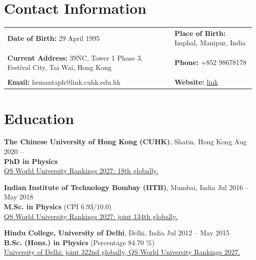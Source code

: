 \documentclass[margin,line]{res}
\begin{document}
 \hfill {}

\begin{resume}

\section{\sc Contact Information}

\vspace{.05in}
\begin{tabular}{@{}p{3.5in}p{2.2in}}
{\bf Date of Birth:} 29 April 1995 & {\bf Place of Birth:} Imphal, Manipur, India \\ \\
{\bf Current Address:} 39NC, Tower 1 Phase 3, Festival City, Tai Wai, Hong Kong & {\bf Phone:} +852 98678178 \\ \\
{\bf Email:} hemantaph@link.cuhk.edu.hk & { \bf Website:} \href{http://hemantaph.com/}{link}
\end{tabular}


\vspace{.25in}
\section{\sc Education}
{\bf The Chinese University of Hong Kong (CUHK)}, Shatin, Hong Kong \hfill Aug 2020 -- \\
{\bf PhD in Physics}\\
\href{https://www.topuniversities.com/universities/chinese-university-hong-kong-cuhk}{QS World University Rankings 2027: 18th globally.}

{\bf Indian Institute of Technology Bombay (IITB)}, Mumbai, India \hfill Jul 2016 -- May 2018\\
{\bf M.Sc. in Physics} \hfill(CPI 6.93/10.0)\\
\href{https://www.topuniversities.com/universities/indian-institute-technology-bombay-iitb}{QS World University Rankings 2027: joint 134th globally.}

{\bf Hindu College, University of Delhi}, Delhi, India \hfill Jul 2012 -- May 2015\\
{\bf B.Sc. (Hons.) in Physics} \hfill(Percentage 84.70 \%)\\
\href{https://www.topuniversities.com/universities/university-delhi}{University of Delhi: joint 322nd globally, QS World University Rankings 2027.}


\end{resume}
\end{document}
